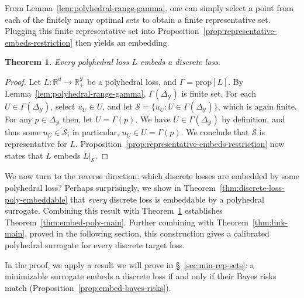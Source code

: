 \documentclass[11pt]{article}
\newcommand{\reals}{\mathbb{R}}
\newcommand{\prop}[1]{\mathrm{prop}[#1]}
\newcommand{\simplex}{\Delta_\Y}
\newcommand{\Sc}{\mathcal{S}}
\newcommand{\Y}{\mathcal{Y}}
\newtheorem{theorem}{Theorem}
\begin{document}
From Lemma~\ref{lem:polyhedral-range-gamma}, one can simply select a point from each of the finitely many optimal sets to obtain a finite representative set.
Plugging this finite representative set into Proposition~\ref{prop:representative-embeds-restriction} then yields an embedding.


\begin{theorem}\label{thm:poly-embeds-discrete}
  Every polyhedral loss $L$ embeds a discrete loss.
\end{theorem}
\begin{proof}
  Let $L:\reals^d\to\reals_+^\Y$ be a polyhedral loss, and $\Gamma = \prop{L}$.
  By Lemma~\ref{lem:polyhedral-range-gamma}, $\Gamma(\simplex)$ is finite set. 
  For each $U\in \Gamma(\simplex)$, select $u_U \in U$, and let $\Sc = \{u_U : U \in\Gamma(\simplex)\}$, which is again finite.
  For any $p\in\simplex$ then, let $U = \Gamma(p)$.
  We have $U \in \Gamma(\simplex)$ by definition, and thus some $u_U \in \Sc$; in particular, $u_U \in U = \Gamma(p)$.
  We conclude that $\Sc$ is representative for $L$.
  Proposition~\ref{prop:representative-embeds-restriction} now states that $L$ embeds $L|_\Sc$.
\end{proof}

We now turn to the reverse direction: which discrete losses are embedded by some polyhedral loss?
Perhaps surprisingly, we show in Theorem~\ref{thm:discrete-loss-poly-embeddable} that \emph{every} discrete loss is embeddable by a polyhedral surrogate.
Combining this result with Theorem~\ref{thm:poly-embeds-discrete} establishes Theorem~\ref{thm:embed-poly-main}.
Further combining with Theorem~\ref{thm:link-main}, proved in the following section, this construction gives a calibrated polyhedral surrogate for every discrete target loss.

In the proof, we apply a result we will prove in \S~\ref{sec:min-rep-sets}: a minimizable surrogate embeds a discrete loss if and only if their Bayes risks match (Proposition~\ref{prop:embed-bayes-risks}).
\end{document}
